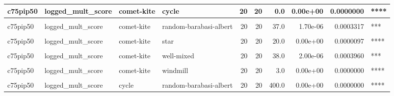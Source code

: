 \documentclass[
]{book}
\begin{document}
\begin{table}
\begin{tabular}{l|l|l|l|r|r|r|r|r|l}
\hline
c75pip50 & logged\_mult\_score & comet-kite & cycle & 20 & 20 & 0.0 & 0.00e+00 & 0.0000000 & ****\\
\hline
\cellcolor{gray!6}{c75pip50} & \cellcolor{gray!6}{logged\_mult\_score} & \cellcolor{gray!6}{comet-kite} & \cellcolor{gray!6}{linear-chain} & \cellcolor{gray!6}{20} & \cellcolor{gray!6}{20} & \cellcolor{gray!6}{0.0} & \cellcolor{gray!6}{0.00e+00} & \cellcolor{gray!6}{0.0000000} & \cellcolor{gray!6}{****}\\
\hline
c75pip50 & logged\_mult\_score & comet-kite & random-barabasi-albert & 20 & 20 & 37.0 & 1.70e-06 & 0.0003317 & ***\\
\hline
\cellcolor{gray!6}{c75pip50} & \cellcolor{gray!6}{logged\_mult\_score} & \cellcolor{gray!6}{comet-kite} & \cellcolor{gray!6}{random-waxman} & \cellcolor{gray!6}{20} & \cellcolor{gray!6}{20} & \cellcolor{gray!6}{18.0} & \cellcolor{gray!6}{0.00e+00} & \cellcolor{gray!6}{0.0000058} & \cellcolor{gray!6}{****}\\
\hline
c75pip50 & logged\_mult\_score & comet-kite & star & 20 & 20 & 20.0 & 0.00e+00 & 0.0000097 & ****\\
\hline
\cellcolor{gray!6}{c75pip50} & \cellcolor{gray!6}{logged\_mult\_score} & \cellcolor{gray!6}{comet-kite} & \cellcolor{gray!6}{toroidal-lattice} & \cellcolor{gray!6}{20} & \cellcolor{gray!6}{20} & \cellcolor{gray!6}{6.0} & \cellcolor{gray!6}{0.00e+00} & \cellcolor{gray!6}{0.0000001} & \cellcolor{gray!6}{****}\\
\hline
c75pip50 & logged\_mult\_score & comet-kite & well-mixed & 20 & 20 & 38.0 & 2.00e-06 & 0.0003960 & ***\\
\hline
\cellcolor{gray!6}{c75pip50} & \cellcolor{gray!6}{logged\_mult\_score} & \cellcolor{gray!6}{comet-kite} & \cellcolor{gray!6}{wheel} & \cellcolor{gray!6}{20} & \cellcolor{gray!6}{20} & \cellcolor{gray!6}{0.0} & \cellcolor{gray!6}{0.00e+00} & \cellcolor{gray!6}{0.0000000} & \cellcolor{gray!6}{****}\\
\hline
c75pip50 & logged\_mult\_score & comet-kite & windmill & 20 & 20 & 3.0 & 0.00e+00 & 0.0000000 & ****\\
\hline
\cellcolor{gray!6}{c75pip50} & \cellcolor{gray!6}{logged\_mult\_score} & \cellcolor{gray!6}{cycle} & \cellcolor{gray!6}{linear-chain} & \cellcolor{gray!6}{20} & \cellcolor{gray!6}{20} & \cellcolor{gray!6}{145.0} & \cellcolor{gray!6}{1.42e-01} & \cellcolor{gray!6}{1.0000000} & \cellcolor{gray!6}{ns}\\
\hline
c75pip50 & logged\_mult\_score & cycle & random-barabasi-albert & 20 & 20 & 400.0 & 0.00e+00 & 0.0000000 & ****\\

\end{tabular}
\end{table}
\end{document}
